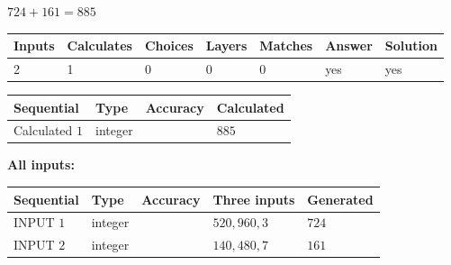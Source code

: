 \documentclass{ctexart}
\begin{document}
 

 
 
 
\noindent{}
 
 

$ %
724 +  %
161=   %
885$
 
 
\noindent{}
 
 

 
   
   
   
   
\noindent\begin{tabular}{|l|l|l|l|l|l|l|}
 \hline
Inputs & Calculates & Choices & Layers & Matches & Answer & Solution \\ \hline
 2  & 
 1  & 
 0
  & 
 0  & 
 0  & 
  yes & 
  yes 
  \\ \hline
 \end{tabular}
   
   
   
   
\noindent{}
   
   
  
  
\noindent\begin{tabular}{|l|l|l|l|}
\hline
 Sequential & Type & Accuracy & Calculated \\ 
\hline
 
 
  Calculated $  1 $ & integer &  & 
  $ 885 $ 
 \\  \hline  
 \end{tabular}
   
   
   
   
\noindent\vspace{0.1in}\hspace{-0.08in} {\textbf{\Large{All inputs: }}}
   
   
  
  
\noindent\begin{tabular}{|l|l|l|l|l|}
\hline
 Sequential & Type & Accuracy & Three inputs & Generated \\ 
\hline
 
 
  INPUT $  1 $ & integer &  & $
 520
 , 
 960
 , 
 3
 $ & $ 724 $ 
 \\  \hline  
 
 
  INPUT $  2 $ & integer &  & $
 140
 , 
 480
 , 
 7
 $ & $ 161 $ 
 \\  \hline  
 \end{tabular}
   
\end{document}
